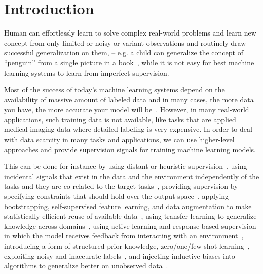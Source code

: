\chapter{Introduction}
%
\begin{quote}
\end{quote}
%

Human can effortlessly learn to solve complex real-world problems and learn new concept from only limited or noisy or variant observations and routinely draw successful generalization on them, – e.g. a child can generalize the concept of ``penguin'' from a single picture in a book~\cite{vinyals2016matching}, while it is not easy for best machine learning systems to learn from imperfect supervision.

Most of the success of today's machine learning systems depend on the availability of massive amount of labeled data and in many cases, the more data you have, the more accurate your model will be~\citep{halevy2009unreasonable,sun2017revisiting}. 
However, in many real-world applications, such training data is not available, like tasks that are applied medical imaging data where detailed labeling is very expensive. In order to deal with data scarcity in many tasks and applications, we can use higher-level approaches and provide supervision signals for training machine learning models. 

This can be done for instance by
using distant or heuristic supervision~\citep{Deriu2016:SemEval,Severyn:2015:SemEval, Dehghani:2016:SIGIR, dehghani:2018:ICLR, Dehghani:2017:nips_metalearn, Ratner:2016,Rekatsinas:2017,Varma:2017}, 
%
using incidental signals that exist in the data and the environment independently of the tasks and they are co-related to the target tasks~\citep{roth2017incidental}, 
%
providing supervision by specifying constraints that should hold over the output space~\citep{stewart2017label, clarke2010driving}, 
%
applying bootstrapping, self-supervised feature learning, and data augmentation to make statistically efficient reuse of available data~\citep{cubuk2018autoaugment, dosovitskiy2016discriminative,donahue2016adversarial},
%
using transfer learning to generalize knowledge across domains~\citep{Ruder:2019},
%
using active learning and response-based supervision in which the model receives feedback from interacting with an environment~\citep{clarke2010driving,riezler2014response},
%
introducing a form of structured prior knowledge\citep{Dehghani:CIKM2016:long,Dehghani:2016:ICTIR}, 
%
zero/one/few-shot learning~\citep{vinyals2016matching,finn2017model,snell2017prototypical,socher2013zero},
%
exploiting noisy and inaccurate labels~\citep{Vahdat:2017, Lee:2013,Hinton:2015,Brodley:1999,reed2014training, Patrini:2016, patrini2016loss,malach2017decoupling}, 
%
and injecting inductive biases into algorithms to generalize better on unobserved data~\citep{cohen2016group, cohen2016steerable, Dehghani:ICLR:2019}.


